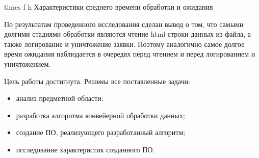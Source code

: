 \FloatBarrier
{}
{times} %
{f} %
{h} %
{\textwidth} %
{Характеристики среднего времени обработки и ожидания} %
\FloatBarrier

По результатам проведенного исследования сделан вывод о том, что самыми долгими стадиями обработки являются чтение html-строки данных из файла, а также логирование и уничтожение заявки. Поэтому аналогично самое долгое время ожидания наблюдается в очередях перед чтением и перед логированием и уничтожением. 


Цель работы достигнута. Решены все поставленные задачи: 
\begin{itemize}
    \item анализ предметной области;
    \item разработка алгоритма конвейерной обработки данных;
    \item создание ПО, реализующего разработанный алгоритм;
    \item исследование характеристик созданного ПО.
\end{itemize}
